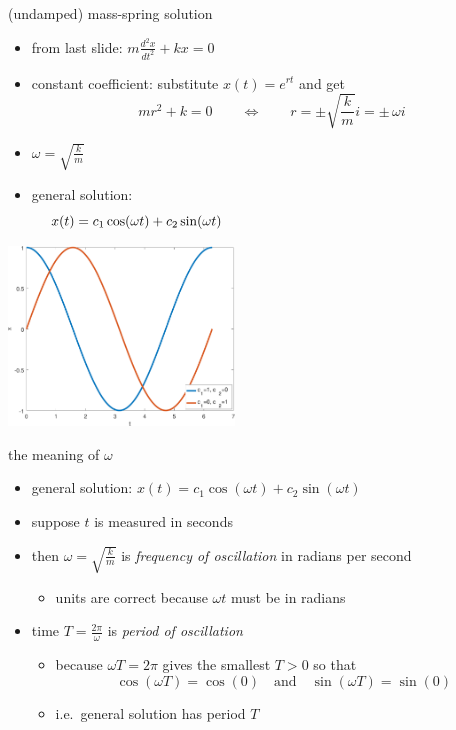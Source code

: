 \documentclass[urlcolor=blue]{beamer}
\begin{document}
\begin{frame}{(undamped) mass-spring solution}

\begin{itemize}
\item from last slide: $m \frac{d^2x}{dt^2} + k x = 0$
\item constant coefficient: substitute $x(t)=e^{rt}$ and get
    $$m r^2 + k = 0 \qquad \iff \qquad r = \pm \sqrt{\frac{k}{m}} i = \pm\, \omega i$$
\item \alert{$\omega = \sqrt{\frac{k}{m}}$}
\item general solution:
    $$x(t) = c_1 \cos(\omega t) + c_2 \sin(\omega t) \hspace{70mm}$$
\end{itemize}

\vspace{-20mm}
\hfill \includegraphics[width=0.45\textwidth]{figs/cossin}
\end{frame}


\begin{frame}{the meaning of $\omega$}

\begin{itemize}
\item general solution: $x(t) = c_1 \cos(\omega t) + c_2 \sin(\omega t)$
\item suppose $t$ is measured in seconds
\item then $\omega = \sqrt{\frac{k}{m}}$ is \emph{frequency of oscillation} in radians per second
    \begin{itemize}
    \item units are correct because $\omega t$ must be in radians
    \end{itemize}
\item time \alert{$T = \frac{2\pi}{\omega}$} is \emph{period of oscillation}
    \begin{itemize}
    \item because $\omega T=2\pi$ gives the smallest $T>0$ so that
        $$\cos(\omega T) = \cos(0) \quad \text{and} \quad \sin(\omega T) = \sin(0)$$
    \item i.e.~general solution has period $T$
    \end{itemize}
\end{itemize}
\end{frame}
\end{document}

